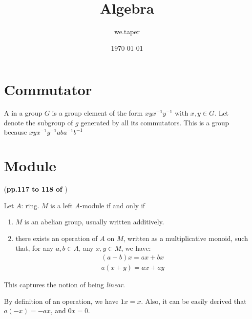\documentclass{article}
\title{Algebra}
\date{\today}
\author{we.taper}
\begin{document}
\maketitle
{}
\tableofcontents

\section{Commutator}
\label{sec:Commutator}

A  in a group $G$ is a group element of the form
$xyx^{-1}y^{-1}$ with $x,y\in G$. Let  denote the
subgroup of $g$ generated by all its commutators. This is a group
because $xyx^{-1}y^{-1}aba^{-1}b^{-1}$


\section{Module}
\label{sec:Module}
(\textbf{pp.117 to 118 of \cite{lang}})
\begin{defi}[Module]
Let $A$: ring. $M$ is a left $A$-module if and only if 
\begin{enumerate}
    \item $M$ is an abelian group, usually written additively.
    \item there exists an operation of $A$ on $M$, written as a
        multiplicative monoid, such that, for any $a,b\in A$, any
        $x,y \in M$, we have:
        \begin{align}
            (a+b) x = ax + bx\\
            a(x+y) = ax + ay
        \end{align}
\end{enumerate}
    This captures the notion of being \textit{linear}.
\end{defi}

By definition of an operation, we have $1x = x$. Also, it can be easily
derived that $a(-x) = -ax$, and $0x=0$.
\end{document}
